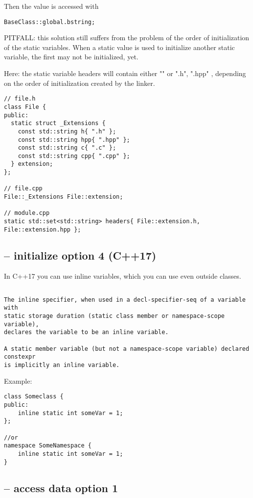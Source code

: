 Then the value is accessed with
\begin{verbatim}
BaseClass::global.bstring;
\end{verbatim}


PITFALL: this solution still suffers from the problem of the order of
initialization of the static variables. When a static value is used to
initialize another static variable, the first may not be initialized, yet.

Here: the static variable headers will contain either { "" } or { ".h", ".hpp"
}, depending on the order of initialization created by the linker.

\begin{verbatim}
// file.h
class File {
public:
  static struct _Extensions {
    const std::string h{ ".h" };
    const std::string hpp{ ".hpp" };
    const std::string c{ ".c" };
    const std::string cpp{ ".cpp" };
  } extension;
};

// file.cpp
File::_Extensions File::extension;

// module.cpp
static std::set<std::string> headers{ File::extension.h, File::extension.hpp };
\end{verbatim}


\subsection{-- initialize option 4 (C++17)}

In C++17 you can use inline variables, which you can use even outside classes.
\begin{verbatim}

The inline specifier, when used in a decl-specifier-seq of a variable with
static storage duration (static class member or namespace-scope variable),
declares the variable to be an inline variable.

A static member variable (but not a namespace-scope variable) declared constexpr
is implicitly an inline variable.
\end{verbatim}

Example:
\begin{lstlisting}
class Someclass {
public:
    inline static int someVar = 1;
};

//or 
namespace SomeNamespace {
    inline static int someVar = 1;
}
\end{lstlisting}

\subsection{-- access data option 1}


